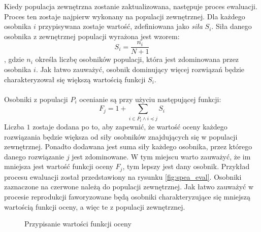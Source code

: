 \documentclass[twoside]{iisthesis}
\begin{document}
Kiedy populacja zewnętrzna zostanie zaktualizowana, następuje proces ewaluacji. Proces ten zostaje najpierw wykonany na populacji zewnętrznej. Dla każdego osobnika $i$ przypisywana zostaje wartość, zdefiniowana jako \textit{siła} $S_{i}$. Siła danego osobnika z zewnętrznej populacji wyrażona jest wzorem:
\begin{equation}\label{eq:str_ep}
	S_{i} = \dfrac{n_{i}}{N + 1}
\end{equation}
, gdzie $n_{i}$ określa liczbę osobników populacji, która jest zdominowana przez osobnika $i$. Jak łatwo zauważyć, osobnik dominujący więcej rozwiązań będzie charakteryzował się większą wartością funkcji $S_{i}$.\\\\
Osobniki z populacji $P_{i}$ ocenianie są przy użyciu następującej funkcji:
\begin{equation}\label{eq:str_p}
	F_{j} = 1 + \sum_{i \in \overline{P_{t}} \wedge i \preceq j} S_{i}
\end{equation}
Liczba $1$ zostaje dodana po to, aby zapewnić, że wartość oceny każdego rozwiązania będzie większa od siły osobników znajdujących się w populacji zewnętrznej. Ponadto dodawana jest suma siły każdego osobnika, przez którego danego rozwiązanie $j$ jest zdominowane. W tym miejscu warto zauważyć, że im mniejsza jest wartość funkcji oceny $F_{j}$, tym lepszy jest dany osobnik. Przykład procesu ewaluacji został przedstawiony na rysunku \eqref{fig:spea_eval}. Osobniki zaznaczone na czerwone należą do populacji zewnętrznej. Jak łatwo zauważyć w procesie reprodukcji faworyzowane będą osobniki charakteryzujące się mniejszą wartością funkcji oceny, a więc te z populacji zewnętrznej.
\begin{figure}[!htb]
	\centering
	\caption{Przypisanie wartości funkcji oceny}
	\label{fig:spea_eval}
\end{figure}
\end{document}

